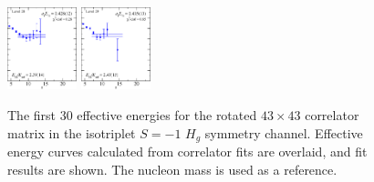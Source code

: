 \begin{figure}[H]
    \includegraphics[width=0.18\textwidth]{figures/sigmas/hg/fits/fit_27.pdf}
    \includegraphics[width=0.18\textwidth]{figures/sigmas/hg/fits/fit_29.pdf}
    \caption{The first 30 effective energies for the rotated $43\times 43$ correlator matrix in the isotriplet $S=-1$ $H_g$ symmetry channel. Effective energy curves calculated from correlator fits are overlaid, and fit results are shown. The nucleon mass is used as a reference.}\label{fig:hg_fits1}
\end{figure}

